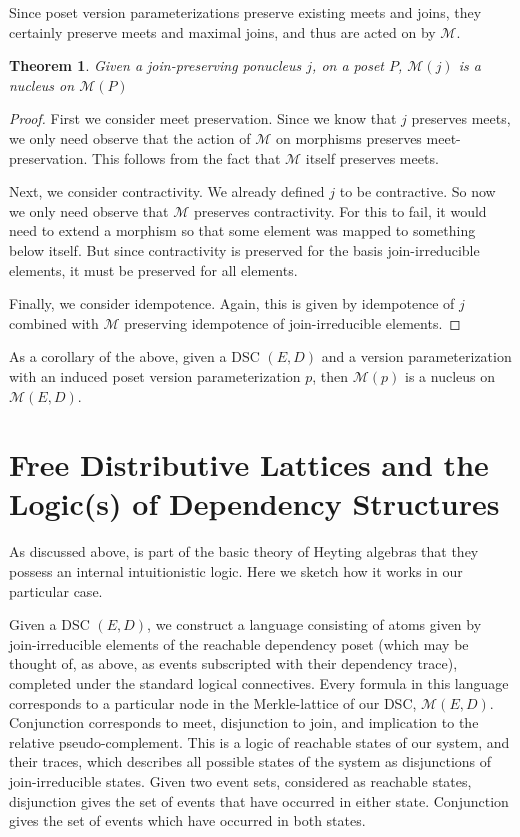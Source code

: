 \documentclass[hoptionsi,review,format=acmsmall]{acmart}
\newtheorem{theorem}{Theorem}[section]
\theoremstyle{definition}
\newcommand{\Mcc}{\mathcal{M}}
\begin{document}
Since poset version parameterizations preserve existing meets and joins, they certainly preserve meets and maximal joins, and thus are acted on by \(\Mcc\).

\begin{theorem}
Given a join-preserving ponucleus \(j\), on a poset \(P\),  \(\Mcc(j)\) is a nucleus on \(\Mcc(P)\)
\end{theorem}
\begin{proof}
First we consider meet preservation. Since we know that \(j\) preserves meets, we only need observe that the action of \(\Mcc\) on morphisms preserves meet-preservation. This follows from the fact that \(\Mcc\) itself preserves meets.


Next, we consider contractivity. We already defined \(j\) to be contractive. So now we only need observe that \(\Mcc\) preserves contractivity. For this to fail, it would need to extend a morphism so that some element was mapped to something below itself. But since contractivity is preserved for the basis join-irreducible elements, it must be preserved for all elements.

Finally, we consider idempotence. Again, this is given by idempotence of \(j\) combined with \(\Mcc\) preserving idempotence of join-irreducible elements.
\end{proof}

As a corollary of the above, given a DSC \((E,D)\) and a version parameterization with an induced poset version parameterization \(p\), then \(\Mcc(p)\) is a nucleus on \(\Mcc(E,D)\).


\section{Free Distributive Lattices and the Logic(s) of Dependency Structures}
As discussed above, is part of the basic theory of Heyting algebras that they possess an internal intuitionistic logic. Here we sketch how it works in our particular case.

Given a DSC \((E,D)\), we construct a language consisting of atoms given by join-irreducible elements of the reachable dependency poset (which may be thought of, as above, as events subscripted with their dependency trace), completed under the standard logical connectives. Every formula in this language corresponds to a particular node in the Merkle-lattice of our DSC, \(\Mcc(E,D)\).  Conjunction corresponds to meet, disjunction to join, and implication to the relative pseudo-complement. This is a logic of reachable states of our system, and their traces, which describes all possible states of the system as disjunctions of join-irreducible states. Given two event sets, considered as reachable states, disjunction gives the set of events that have occurred in either state. Conjunction gives the set of events which have occurred in both states.
\end{document}
